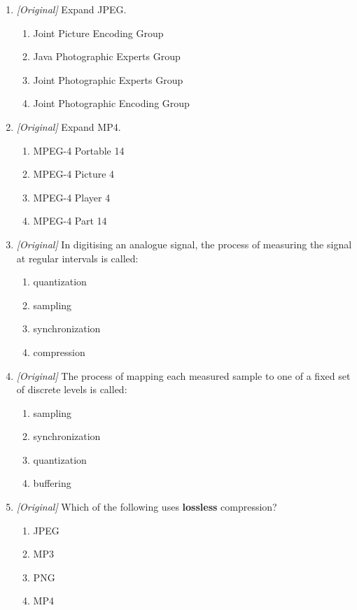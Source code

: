 \documentclass[11pt]{article}
\begin{document}
\begin{enumerate}[label=\textbf{Q\arabic*.}, leftmargin=*]
\begin{enumerate}[label=\Alph*.]
  \end{enumerate}
\item \textit{[Original]} Expand JPEG.
  \begin{enumerate}[label=\Alph*.]
    \item Joint Picture Encoding Group
    \item Java Photographic Experts Group
    \item Joint Photographic Experts Group
    \item Joint Photographic Encoding Group
  \end{enumerate}
\item \textit{[Original]} Expand MP4.
  \begin{enumerate}[label=\Alph*.]
    \item MPEG-4 Portable 14
    \item MPEG-4 Picture 4
    \item MPEG-4 Player 4
    \item MPEG-4 Part 14
  \end{enumerate}
\item \textit{[Original]} In digitising an analogue signal, the process of
  measuring the signal at regular intervals is called:
  \begin{enumerate}[label=\Alph*.]
    \item quantization
    \item sampling
    \item synchronization
    \item compression
  \end{enumerate}
\item \textit{[Original]} The process of mapping each measured sample to one of
  a fixed set of discrete levels is called:
  \begin{enumerate}[label=\Alph*.]
    \item sampling
    \item synchronization
    \item quantization
    \item buffering
  \end{enumerate}
\item \textit{[Original]} Which of the following uses \textbf{lossless}
  compression?
  \begin{enumerate}[label=\Alph*.]
    \item JPEG
    \item MP3
    \item PNG
    \item MP4
  \end{enumerate}

\end{enumerate}
\end{document}

